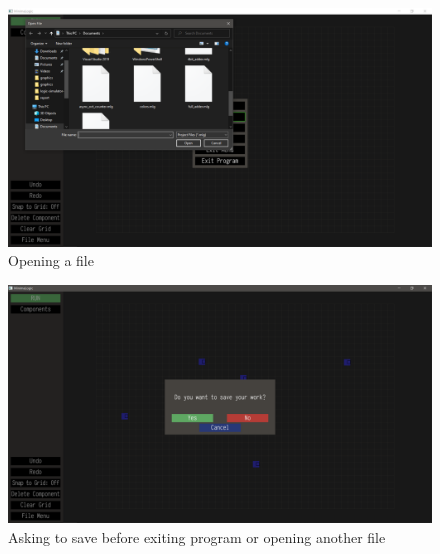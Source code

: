 \documentclass[report]{subfiles}
\begin{document}
\begin{figure}[H]
    \centering
    \includegraphics[width=\textwidth]{../graphics/opening_file.png}
    \caption{Opening a file}
\end{figure}
\begin{figure}[H]
    \centering
    \includegraphics[width=\textwidth]{../graphics/confirm_save.png}
    \caption{Asking to save before exiting program or opening another file}
\end{figure}
\end{document}
